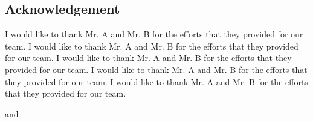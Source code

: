 \begin{center}
  \section*{Acknowledgement}
\end{center}


\begin{spacing}{1.5}
  I would like to thank Mr. A and Mr. B for the efforts that they provided for our team. I would like to thank Mr. A and Mr. B for the efforts that they provided for our team. I would like to thank Mr. A and Mr. B for the efforts that they provided for our team. I would like to thank Mr. A and Mr. B for the efforts that they provided for our team. I would like to thank Mr. A and Mr. B for the efforts that they provided for our team. 
\end{spacing}

\begin{flushright}
  {\firststudentname} and {\secondstudentname}
\end{flushright}

\clearpage
\vspace*{2cm}